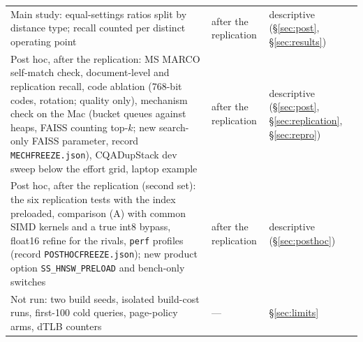 \begin{table}[h]
\begin{tabularx}{\textwidth}{p{3.6cm}p{2.1cm}X}
Main study: equal-settings ratios split by distance type; recall counted per distinct operating point & after the replication & descriptive (\S\ref{sec:post}, \S\ref{sec:results}) \\
Post hoc, after the replication: MS MARCO self-match check, document-level and replication recall, code ablation (768-bit codes, rotation; quality only), mechanism check on the Mac (bucket queues against heaps, FAISS counting top-$k$; new search-only FAISS parameter, record \texttt{MECHFREEZE.json}), CQADupStack dev sweep below the effort grid, laptop example & after the replication & descriptive (\S\ref{sec:post}, \S\ref{sec:replication}, \S\ref{sec:repro}) \\
Post hoc, after the replication (second set): the six replication tests with the index preloaded, comparison (A) with common SIMD kernels and a true int8 bypass, float16 refine for the rivals, \texttt{perf} profiles (record \texttt{POSTHOCFREEZE.json}); new product option \texttt{SS\_HNSW\_PRELOAD} and bench-only switches & after the replication & descriptive (\S\ref{sec:posthoc}) \\
Not run: two build seeds, isolated build-cost runs, first-100 cold queries, page-policy arms, dTLB counters & --- & \S\ref{sec:limits} \\\bottomrule
\end{tabularx}
\end{table}
